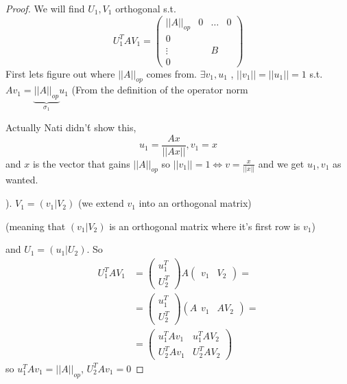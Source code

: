 \begin{proof}
We will find $U_{1},V_{1}$ orthogonal s.t. 
\[
U_{1}^{T}AV_{1}=\left(\begin{array}{c|ccc}
\left|\left|A\right|\right|_{op} & 0 & \dots & 0\\
\hline 0\\
\vdots &  & B\\
0
\end{array}\right)
\]
First lets figure out where $\left|\left|A\right|\right|_{op}$ comes
from. $\exists v_{1},u_{1}$ , $\left|\left|v_{1}\right|\right|=\left|\left|u_{1}\right|\right|=1$
s.t. $Av_{1}=\underbrace{\left|\left|A\right|\right|_{op}}_{\sigma_{1}}u_{1}$
(From the definition of the operator norm%
\begin{insight}
Actually Nati didn'\'{t} show this, 
\[
u_{1}=\frac{Ax}{\left|\left|Ax\right|\right|},v_{1}=x
\]
 and $x$ is the vector that gains $\left|\left|A\right|\right|_{op}$
so $\left|\left|v_{1}\right|\right|=1\iff v=\frac{x}{\left|\left|x\right|\right|}$
and we get $u_{1},v_{1}$ as wanted.%
\end{insight}
). $V_{1}=\left(v_{1}|V_{2}\right)$ (we extend $v_{1}$ into an orthogonal
matrix)%
\begin{insight}
(meaning that $\left(v_{1}|V_{2}\right)$ is an orthogonal matrix
where it's first row is $v_{1}$)%
\end{insight}
{} and $U_{1}=\left(u_{1}|U_{2}\right)$. So 
\begin{align*}
U_{1}^{T}AV_{1} & =\left(\begin{array}{c}
u_{1}^{T}\\
\hline U_{2}^{T}
\end{array}\right)A\left(\begin{array}{c|c}
v_{1} & V_{2}\end{array}\right)=\\
 & =\left(\begin{array}{c}
u_{1}^{T}\\
\hline U_{2}^{T}
\end{array}\right)\left(A\begin{array}{c|c}
v_{1} & AV_{2}\end{array}\right)=\\
 & =\left(\begin{array}{c|c}
u_{1}^{T}Av_{1} & u_{1}^{T}AV_{2}\\
\hline U_{2}^{T}Av_{1} & U_{2}^{T}AV_{2}
\end{array}\right)
\end{align*}
 so $u_{1}^{T}Av_{1}=\left|\left|A\right|\right|_{op}$, $U_{2}^{T}Av_{1}=0$

\end{proof}
